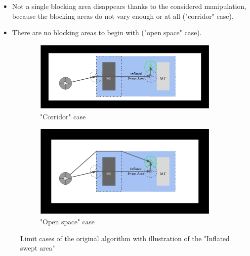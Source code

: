 \begin{itemize}
  \item Not a single blocking area disappears thanks to the considered manipulation, because the blocking areas do not vary enough or at all ("corridor" case),
  \item There are no blocking areas to begin with ("open space" case).
\end{itemize}

\begin{figure}[H]
\centering
\begin{subfigure}{.5\textwidth}
  \centering
  \includegraphics[width=\linewidth]{Figures/Check_New_Opening/corridor_swept.png}
  \caption{"Corridor" case}
  \label{fig:corridor_swept}
\end{subfigure}%
\begin{subfigure}{.5\textwidth}
  \centering
  \includegraphics[width=\linewidth]{Figures/Check_New_Opening/openspace_swept.png}
  \caption{"Open space" case}
  \label{fig:openspace_swept}
\end{subfigure}
\caption{Limit cases of the original algorithm with illustration of the "Inflated swept area"}
\label{fig:inflated_swept_area}
\end{figure}

